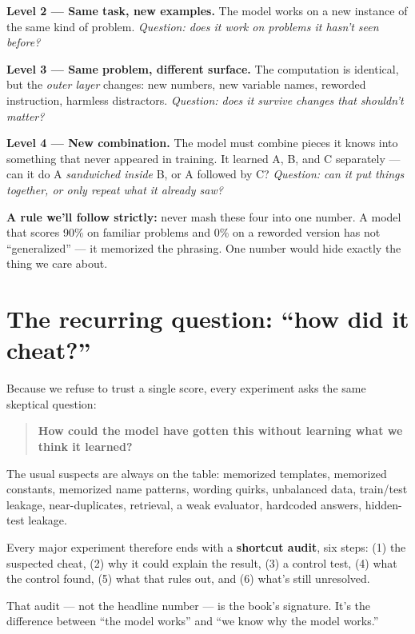 \textbf{Level 2 --- Same task, new examples.} The model works on a new
instance of the same kind of problem. \emph{Question: does it work on
problems it hasn't seen before?}

\textbf{Level 3 --- Same problem, different surface.} The computation is
identical, but the \emph{outer layer} changes: new numbers, new variable
names, reworded instruction, harmless distractors. \emph{Question: does
it survive changes that shouldn't matter?}

\textbf{Level 4 --- New combination.} The model must combine pieces it
knows into something that never appeared in training. It learned A, B,
and C separately --- can it do A \emph{sandwiched inside} B, or A
followed by C? \emph{Question: can it put things together, or only
repeat what it already saw?}

\textbf{A rule we'll follow strictly:} never mash these four into one
number. A model that scores 90\% on familiar problems and 0\% on a
reworded version has not ``generalized'' --- it memorized the phrasing.
One number would hide exactly the thing we care about.

\section{The recurring question: ``how did it
cheat?''}\label{the-recurring-question-how-did-it-cheat}

Because we refuse to trust a single score, every experiment asks the
same skeptical question:

\begin{quote}
\textbf{How could the model have gotten this without learning what we
think it learned?}
\end{quote}

The usual suspects are always on the table: memorized templates,
memorized constants, memorized name patterns, wording quirks, unbalanced
data, train/test leakage, near-duplicates, retrieval, a weak evaluator,
hardcoded answers, hidden-test leakage.

Every major experiment therefore ends with a \textbf{shortcut audit},
six steps: (1) the suspected cheat, (2) why it could explain the result,
(3) a control test, (4) what the control found, (5) what that rules out,
and (6) what's still unresolved.

That audit --- not the headline number --- is the book's signature. It's
the difference between ``the model works'' and ``we know why the model
works.''
